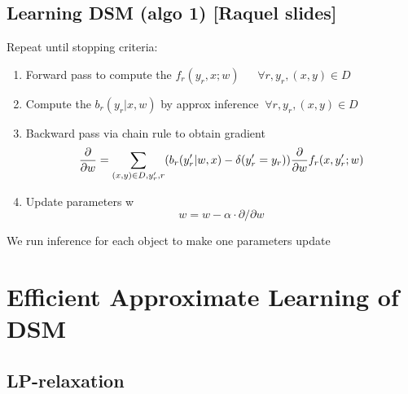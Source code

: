\documentclass{beamer}
\begin{document}
\subsection*{Learning DSM (algo 1) [Raquel slides]}
\begin{frame}
	\begin{tcolorbox}[colback=white!2, colframe=gray!90, title=Deep Structured Learning (algo 1)]
		Repeat until stopping criteria:
		\begin{enumerate}
			\item Forward pass to compute the $f_r(y_r , x; w)~~~~~~~\forall r, y_r, (x, y) \in D$
			\item Compute the $b_r(y_r | x, w)$ by approx inference $~\forall r, y_r, (x, y) \in D$
			\item Backward pass via chain rule to obtain gradient
			$$\frac{\partial}{\partial w}= \sum_{(x, y) \in D, y'_{\textcolor{black}{r}}, {\textcolor{black}{r}}} (\textcolor{black}{b_{{\textcolor{black}{r}}}(y'_{\textcolor{black}{r}}|w, x)} - \delta(y'_{\textcolor{black}{r}}=y_{\textcolor{black}{r}})) \frac{\partial}{\partial w} f_{\textcolor{black}{r}}(x, y'_{\textcolor{black}{r}}; w)$$ 
			\item Update parameters w 
				$$w = w  - \alpha \cdot \partial/\partial w$$
		\end{enumerate}
	\end{tcolorbox}
	
	\begin{tcolorbox}[colback=gray!2, colframe=red!90, title=Problem]
		\centering We run inference  for each object to make one parameters update
	\end{tcolorbox}
\end{frame}

\section{Efficient Approximate Learning of DSM}
	\frame{\tableofcontents[currentsection]}
	
\subsection*{LP-relaxation}
\end{document}
